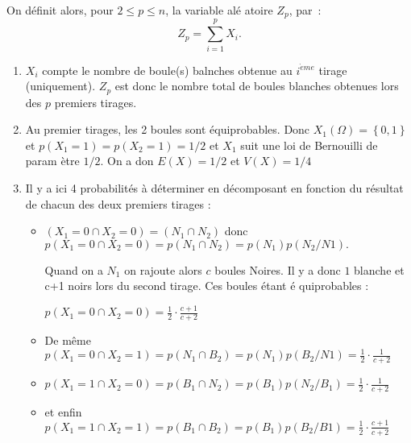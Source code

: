 \documentclass[a4paper, 11pt,reqno]{article}
\begin{document}
\begin{correction}
On d\'{e}finit alors, pour $2\leqslant p\leqslant n$, la variable al\'{e}%
atoire $Z_{p}$, par~: 
\begin{equation*}
Z_{p}=\sum_{i=1}^{p}X_{i}.
\end{equation*}

\begin{enumerate}
\item $X_{i}$ compte le nombre de boule(s) balnches obtenue au $i^{\grave{e}%
me}$ tirage (uniquement). $Z_{p}$ est donc le nombre total de boules
blanches obtenues lors des $p$ premiers tirages.

\item Au premier tirages, les 2 boules sont \'{e}quiprobables. Donc $%
X_{1}\left( \Omega \right) =\left\{ 0,1\right\} $ et $p\left( X_{1}=1\right)
=p\left( X_{2}=1\right) =1/2$ et $X_{1}$ suit une loi de Bernouilli de param%
\`{e}tre $1/2.$ On a don $E\left( X\right) =1/2$ et $V\left( X\right) =1/4$

\item Il y a ici 4 probabilit\'{e}s \`{a} d\'{e}terminer en d\'{e}composant
en fonction du r\'{e}sultat de chacun des deux premiers tirages :

\begin{itemize}
\item $\left( X_{1}=0\cap X_{2}=0\right) =\left( N_{1}\cap N_{2}\right) $
donc $p\left( X_{1}=0\cap X_{2}=0\right) =p\left( N_{1}\cap N_{2}\right)
=p\left( N_{1}\right) p\left( N_{2}/N1\right) .$

Quand on a $N_{1}$ on rajoute alors $c$ boules Noires. Il y a donc $1$
blanche et c+1 noirs lors du second tirage. Ces boules \'{e}tant \'{e}%
quiprobables :

$p\left( X_{1}=0\cap X_{2}=0\right) =\displaystyle
\frac{1}{2}\cdot \frac{c+1}{c+2}$

\item De m\^{e}me $p\left( X_{1}=0\cap X_{2}=1\right) =p\left( N_{1}\cap
B_{2}\right) =p\left( N_{1}\right) p\left( B_{2}/N1\right) =\displaystyle
\frac{1}{2}\cdot \frac{1}{c+2}$

\item $p\left( X_{1}=1\cap X_{2}=0\right) =p\left( B_{1}\cap N_{2}\right)
=p\left( B_{1}\right) p\left( N_{2}/B_{1}\right) =\displaystyle
\frac{1}{2}\cdot \frac{1}{c+2}$

\item et enfin $p\left( X_{1}=1\cap X_{2}=1\right) =p\left( B_{1}\cap
B_{2}\right) =p\left( B_{1}\right) p\left( B_{2}/B1\right) =\displaystyle
\frac{1}{2}\cdot \frac{c+1}{c+2}$
\end{itemize}


\end{enumerate}
\end{correction}
\end{document}
